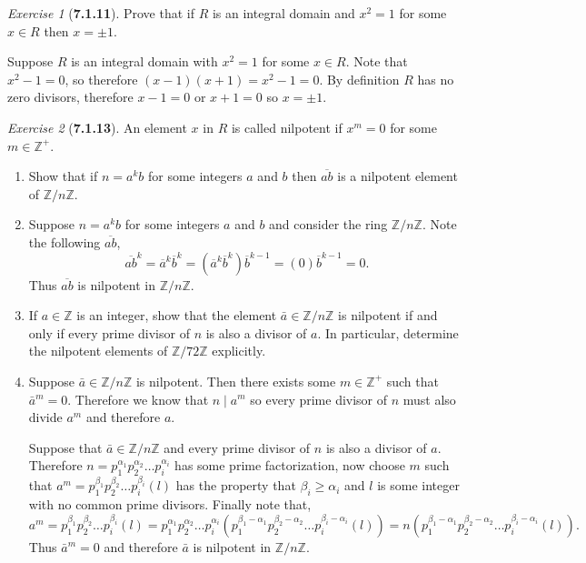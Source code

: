\documentclass[12pt]{amsart}
\makeatletter
\theoremstyle{remark}
\newtheorem*{exercise}{Exercise}%
\def\ZZ{\ensuremath{\mathbb Z}}
\renewenvironment{proof}[1][\proofname]{\par\doublespacing
  \pushQED{\qed}%
  \normalfont \topsep6\p@\@plus6\p@\relax
  \list{}{%
    \settowidth{\leftmargin}{\itshape\proofname:\hskip\labelsep}%
    \setlength{\labelwidth}{0pt}%
    \setlength{\itemindent}{-\leftmargin}%
  }%
  \item[\hskip\labelsep\itshape#1\@addpunct{:}]\ignorespaces
}{%
  \popQED\endlist\@endpefalse
  \singlespacing
}
\theoremstyle{mycomment}
\makeatother
\begin{document}
\begin{exercise}[\textbf{7.1.11}] Prove that if $R$ is an integral domain and $x^2 = 1$ for some $x \in R$ then $x = \pm 1$. 
    \begin{proof} Suppose $R$ is an integral domain with $x^2 = 1$ for some $x \in R$. Note that $x^2 - 1 = 0$, so therefore 
      $(x - 1)(x + 1) = x^2 - 1 = 0$. By definition $R$ has no zero divisors, therefore $x - 1 = 0$ or $x + 1 = 0$ so $x = \pm 1$.
      \end{proof}
\end{exercise}
\vspace{.15in}



\begin{exercise}[\textbf{7.1.13}] An element $x$ in $R$ is called nilpotent if $x^m = 0$ for some $m \in \ZZ^+$.
  \begin{enumerate}
    \item[(a)] Show that if $n = a^kb$ for some integers $a$ and $b$ then $\overline{ab}$ is a nilpotent element of $\ZZ/n\ZZ$. 
    \begin{proof} Suppose $n = a^kb$ for some integers $a$ and $b$ and consider the ring $\ZZ/n\ZZ$. Note the following $\overline{ab}$, 
      \begin{equation*}
      \overline{ab}^k = \overline{a}^k\overline{b}^k = (\overline{a}^k\overline{b}^k)\overline{b}^{k - 1} = (0)\overline{b}^{k - 1} = 0. 
      \end{equation*}
      Thus $\overline{ab}$ is nilpotent in $\ZZ/n\ZZ$. 
    \end{proof}
    \vspace{.15in}

    \item[(b)] If $a \in \ZZ$ is an integer, show that the element $\bar{a} \in \ZZ/n\ZZ$ is nilpotent if and only if every prime 
    divisor of $n$ is also a divisor of $a$. In particular, determine the nilpotent elements of $\ZZ/72\ZZ$ explicitly. 
    \begin{proof} Suppose $\bar{a} \in \ZZ/n\ZZ$ is nilpotent. Then there exists some $m \in \ZZ^+$ such that $\bar{a}^{m} = 0$. 
      Therefore we know that $n \mid a^m$ so every prime divisor of $n$ must also divide $a^m$ and therefore $a$.


      Suppose that $\bar{a} \in \ZZ/n\ZZ$ and every prime divisor of $n$ is also a divisor of $a$. Therefore $n = p_1^{\alpha_1}p_2^{\alpha_2} \dots p_i^{\alpha_i}$ has some 
      prime factorization, now choose $m$ such that $a^m = p_1^{\beta_1}p_2^{\beta_2}\dots p_i^{\beta_i}(l)$ has the property that $\beta_i \geq \alpha_i$ and $l$ is some integer with no common prime divisors.
      Finally note that, 
      \begin{equation*}
        a^m = p_1^{\beta_1}p_2^{\beta_2}\dots p_i^{\beta_i}(l) = p_1^{\alpha_1}p_2^{\alpha_2} \dots p_i^{\alpha_i}(p_1^{\beta_1 - \alpha_1}p_2^{\beta_2 - \alpha_2}\dots p_i^{\beta_i - \alpha_i}(l)) = n(p_1^{\beta_1 - \alpha_1}p_2^{\beta_2 - \alpha_2}\dots p_i^{\beta_i - \alpha_i}(l)).
      \end{equation*}
      Thus $\bar{a}^m = 0$ and therefore $\bar{a}$ is nilpotent in $\ZZ/n\ZZ$. 



\end{proof}
\end{enumerate}
\end{exercise}
\end{document}
